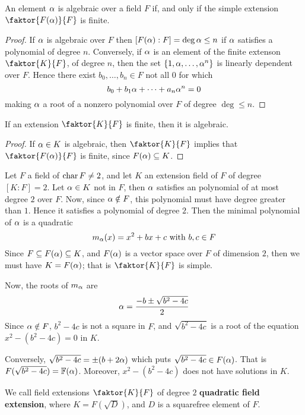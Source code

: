   \begin{lemma}\label{lemma_8.2.3}
    An element $\alpha$ is algebraic over a field  $F$ if, and only if the simple
    extension  $\faktor{F(\a)}{F}$ is finite.
  \end{lemma}
  \begin{proof}
    If $\alpha$ is algebraic over $F$ then  $[F(\alpha):F]=\deg{\alpha} \leq n$ if $\alpha$
    satisfies a polynomial of degree  $n$. Conversely, if  $\alpha$ is an element
    of the finite extenson  $\faktor{K}{F}$, of degree $n$, then the set
    $\{1,\alpha, \dots, \alpha^n\}$ is linearly dependent over $F$. Hence there exist
    $b_0, \dots, b_n \in F$ not all $0$ for which
    \begin{equation*}
      b_0+b_1\alpha+\dots+a_n\alpha^n=0
    \end{equation*}
    making $\alpha$ a root of a nonzero polynomial over $F$ of degree $\deg \leq n$.
  \end{proof}
  \begin{corollary}
    If an extension $\faktor{K}{F}$ is finite, then it is algebraic.
  \end{corollary}
  \begin{proof}
    If $\alpha \in K$ is algebraic, then  $\faktor{K}{F}$ implies that
    $\faktor{F(\a)}{F}$ is finite, since $F(\alpha) \subseteq K$.
  \end{proof}

  \begin{example}\label{example_8.6}
    Let $F$ a field of  $\operatorname{char}{F} \neq 2$, and let $K$ an extension field of
    $F$ of degree $[K:F]=2$. Let $\alpha \in K$  not in $F$, then  $\alpha$ satisfies
    an polynomial of at most degree  $2$ over $F$. Now, since  $\alpha \notin F$,
    this polynomial must have degree greater than $1$. Hence it satisfies a
    polynomial of degree $2$. Then the minimal polynomial of  $\alpha$ is a
    quadratic
    \begin{equation*}
      m_\alpha(x)=x^2+bx+c \text{ with } b,c \in F
    \end{equation*}
    Since $F \subseteq F(\alpha) \subseteq K$, and $F(\alpha)$ is a vector space over
    $F$ of dimension  $2$, then we must have  $K=F(\alpha)$; that is
    $\faktor{K}{F}$ is simple.

    Now, the roots of $m_\alpha$ are
    \begin{equation*}
      \alpha=\frac{-b \pm \sqrt{b^2-4c}}{2}
    \end{equation*}
    Since $\alpha \notin F$,  $b^2-4c$ is not a square in $F$, and
    $\sqrt{b^2-4c}$ is a root of the equation $x^2-(b^2-4c)=0$ in $K$.

    Conversely,  $\sqrt{b^2-4c}=\pm (b+2\alpha)$ which puts $\sqrt{b^2-4c} \in
    F(\alpha)$. That is $F(\sqrt{b^2-4c})=\mathbb{F}(\alpha)$. Moreover, $x^2-(b^2-4c)$ does
    not have solutions in $K$.

    We call field extensions  $\faktor{K}{F}$ of degree $2$ \textbf{quadratic
    field extension}, where $K=F(\sqrt{D})$, and $D$ is a squarefree element of
    $F$.
  \end{example}

